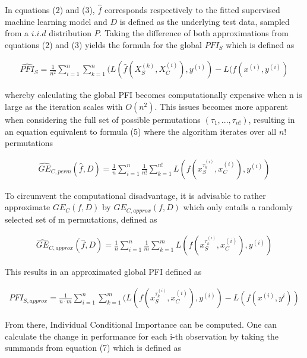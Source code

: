 \documentclass[
]{krantz}
\begin{document}
In equations (2) and (3), \(\hat{f}\) corresponds respectively to the fitted supervised machine learning model and \(D\) is defined as the underlying test data, sampled from a \(i.i.d\) distribution \(P\). Taking the difference of both approximations from equations (2) and (3) yields the formula for the global \(PFI_{S}\) which is defined as

\begin{align}
\widehat{PFI}_{S}  =  \frac{1}{n^{2}}\sum_{i = 1}^{n}\sum_{k = 1}^{n}(L(\hat{f}(X_{S}^{(k)}, X_{C}^{(i)}),  y^{(i)}) - L(f(x^{(i)}, y^{(i)}) \label{eq:eq4}\tag{4}
\end{align}

whereby calculating the global PFI becomes computationally expensive when n is large as the iteration scales with \(O(n^{2})\). This issues becomes more apparent when considering the full set of possible permutations \((\tau_{1}, ..., \tau_{n!})\), resulting in an equation equivalent to formula (5) where the algorithm iterates over all \(n!\) permutations

\begin{align}
\widehat{GE}_{C, perm}(\hat{f}, D) = \frac{1}{n}\sum_{i = 1}^{n} \frac{1}{n!}\sum_{k = 1}^{n!}L(f(x_{S}^{\tau_{k}^{(i)}}, x_{C}^{(i)}), y^{(i)}) \label{eq:eq5}\tag{5}
\end{align}

To circumvent the computational disadvantage, it is advisable to rather approximate \(GE_{C}(f,D)\) by \(GE_{C, approx}(f,D)\) which only entails a randomly selected set of m permutations, defined as

\begin{align}
\widehat{GE}_{C, approx}(\hat{f}, D) = \frac{1}{n}\sum_{i = 1}^{n} \frac{1}{m}\sum_{k = 1}^{m}L(f(x_{S}^{\tau_{k}^{(i)}}, x_{C}^{(i)}), y^{(i)}) \label{eq:eq6}\tag{6}
\end{align}

This results in an approximated global PFI defined as

\begin{align}
PFI_{S,approx} = \frac{1}{n \cdot m}\sum_{i = 1}^{n}\sum_{k = 1}^{m}(L(f(x_{S}^{\tau_{k}^{(i)}}, x_{C}^{(i)}), y^{(i)}) - L(f(x^{(i)}, y^{i})) \label{eq:eq7}\tag{7}
\end{align}

From there, Individual Conditional Importance can be computed. One can calculate the change in performance for each i-th observation by taking the summands from equation (7) which is defined as
\end{document}
